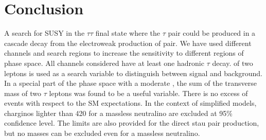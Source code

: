 \section{Conclusion}
\label{sect:conclusion}
A search for SUSY in the $\tau\tau$ final state where the
$\tau$ pair could be produced in a cascade decay from the electroweak production of \PSGcpDo pair.
We have used different channels and search regions to increase the sensitivity to
different regions of phase space. All channels considered have at least one hadronic $\tau$ decay.
 \mttwo of two leptons is used as a search variable to
distinguish between signal and background. In a special part of the phase space with
a moderate \mttwo, the sum of the transverse mass of two $\tau$ leptons was found to be a
useful variable.
There is no excess of events with respect to the SM expectations.
In the context of simplified models, charginos lighter than 420\GeV 
for a massless neutralino  are excluded at 95\% confidence level.
The limits are also provided for the direct stau pair production, but no masses  can be excluded 
even for a massless neutralino.

